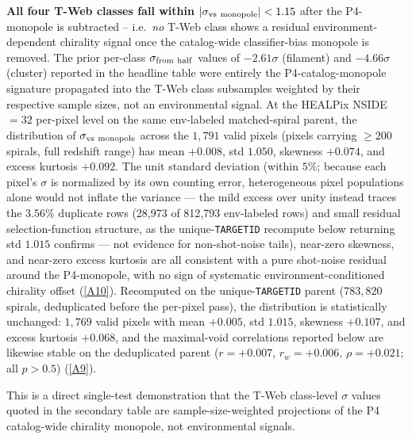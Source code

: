 \documentclass[twocolumn,linenumbers]{aastex702}
\newcommand{\repoBase}{https://github.com/Hubify-Projects/bigbounce/blob/main}
\begin{document}
\textbf{All four T-Web classes fall within
$|\sigma_{\rm vs\ monopole}| < 1.15$} after the P4-monopole is
subtracted -- i.e.\ \emph{no} T-Web class shows a residual
environment-dependent chirality signal once the catalog-wide
classifier-bias monopole is removed. The prior per-class
$\sigma_{\rm from\ half}$ values of $-2.61\sigma$ (filament) and
$-4.66\sigma$ (cluster) reported in the headline table were entirely
the P4-catalog-monopole signature propagated into the T-Web class
subsamples weighted by their respective sample sizes, not an
environmental signal. At the HEALPix NSIDE $=32$ per-pixel level on
the same env-labeled matched-spiral parent, the distribution of
$\sigma_{\rm vs\ monopole}$ across the $1{,}791$ valid pixels
(pixels carrying $\ge 200$ spirals, full redshift range) has
mean $+0.008$, std $1.050$, skewness $+0.074$, and excess kurtosis
$+0.092$. The unit standard deviation (within $5\%$; because each
pixel's $\sigma$ is normalized by its own counting error,
heterogeneous pixel populations alone would not inflate the variance
--- the mild excess over unity instead traces the $3.56\%$ duplicate
rows (28{,}973 of 812{,}793 env-labeled rows) and small residual selection-function structure, as the
unique-\texttt{TARGETID} recompute below returning std $1.015$
confirms --- not evidence for non-shot-noise tails), near-zero
skewness, and near-zero excess kurtosis
are all consistent with a pure shot-noise residual
around the P4-monopole, with no sign of systematic
environment-conditioned chirality offset
(\href{\repoBase/pipelines/p5\_desi\_chirality/outputs/17\_v0151\_closure\_recomputes.json}{[A10]}).
Recomputed on the unique-\texttt{TARGETID} parent ($783{,}820$
spirals, deduplicated before the per-pixel pass), the distribution is
statistically unchanged: $1{,}769$ valid pixels with mean $+0.005$,
std $1.015$, skewness $+0.107$, and excess kurtosis $+0.068$, and the
maximal-void correlations reported below are likewise stable on the
deduplicated parent ($r = +0.007$, $r_w = +0.006$, $\rho = +0.021$;
all $p > 0.5$)
(\href{\repoBase/pipelines/p5\_desi\_chirality/outputs/22\_r24conf\_local\_batch.json}{[A9]}).

This is a direct single-test demonstration that
the T-Web class-level $\sigma$ values quoted in the secondary table
are sample-size-weighted projections of the P4 catalog-wide chirality
monopole, not environmental signals.
\end{document}

